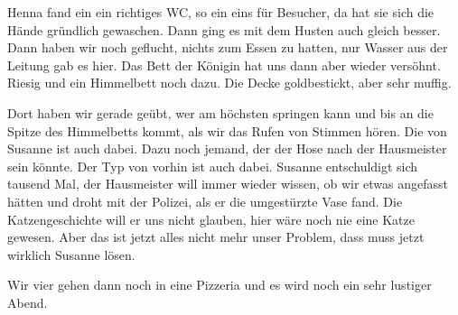 Henna fand ein ein richtiges WC, so ein eins für Besucher, da hat sie sich die Hände gründlich gewaschen. Dann ging es mit dem Husten auch gleich besser. Dann haben wir noch geflucht, nichts zum Essen zu hatten, nur Wasser aus der Leitung gab es hier. Das Bett der Königin hat uns dann aber wieder versöhnt. Riesig und ein Himmelbett noch dazu. Die Decke goldbestickt, aber sehr muffig. 

Dort haben wir gerade geübt, wer am höchsten springen kann und bis an die Spitze des Himmelbetts kommt, als wir das Rufen von Stimmen hören. Die von Susanne ist auch dabei. Dazu noch jemand, der der Hose nach der Hausmeister sein könnte. Der Typ von vorhin ist auch dabei. Susanne entschuldigt sich tausend Mal, der Hausmeister will immer wieder wissen, ob wir etwas angefasst hätten und droht mit der Polizei, als er die umgestürzte Vase fand. Die Katzengeschichte will er uns nicht glauben, hier wäre noch nie eine Katze gewesen. Aber das ist jetzt alles nicht mehr unser Problem, dass muss jetzt wirklich Susanne lösen.

Wir vier gehen dann noch in eine Pizzeria und es wird noch ein sehr lustiger Abend. \hfill {\color{DeepPink}\decofourleft}





